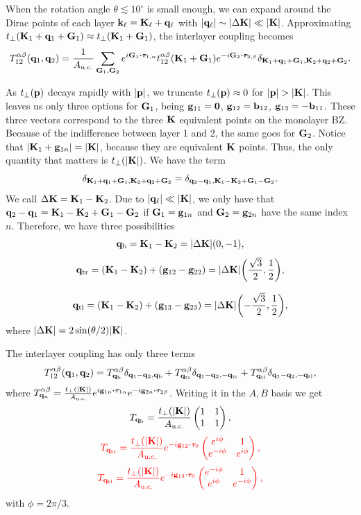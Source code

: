 When the rotation angle $\theta \lesssim 10^\circ$ is small enough, we can expand around the Dirac points of each layer ${\vb{k}}_\ell = {\vb{K}}_\ell + {\vb{q}}_\ell$ with $\abs{{\vb{q}}_\ell} \sim \abs{\Delta {\vb{K}}} \ll \abs{{\vb{K}}}$. Approximating $t_\perp({\vb{K}}_1+{\vb{q}}_1+{\vb{G}}_1) \approx t_\perp({\vb{K}}_1+{\vb{G}}_1)$, the interlayer coupling becomes
$$
T_{12}^{\alpha\beta}(\q_1,\q_2) = \frac{1}{A_{\text{u.c.}}} \sum_{\G_1,\G_2} e^{i\G_1\vdot\vtau_{1,\alpha}}
t_{12}^{\alpha\beta}(\K_1+\G_1) e^{-i\G_2\vdot\vtau_{2,\beta}}
\delta_{\K_1+\q_1+\G_1,\K_2+\q_2+\G_2}.
$$

As $t_\perp({\vb{p}})$ decays rapidly with $\abs{{\vb{p}}}$, we truncate $t_\perp({\vb{p}}) \approx 0$ for $\abs{{\vb{p}}} > \abs{{\vb{K}}}$. This leaves us only three options for ${\vb{G}}_1$, being ${\vb{g}}_{11} = {\vb{0}}$, ${\vb{g}}_{12} = {\vb{b}}_{12}$, ${\vb{g}}_{13} = -{\vb{b}}_{11}$. These three vectors correspond to the three ${\vb{K}}$ equivalent points on the monolayer BZ. Because of the indifference between layer 1 and 2, the same goes for ${\vb{G}}_2$. Notice that $\abs{{\vb{K}}_1+{\vb{g}}_{1n}} = \abs{{\vb{K}}}$, because they are equivalent ${\vb{K}}$ points. Thus, the only quantity that matters is $t_\perp(\abs{{\vb{K}}})$. We have the term
$$
\delta_{{\vb{K}}_1+{\vb{q}}_1+{\vb{G}}_1,{\vb{K}}_2+{\vb{q}}_2+{\vb{G}}_2} = \delta_{{\vb{q}}_2-{\vb{q}}_1,{\vb{K}}_1-{\vb{K}}_2+{\vb{G}}_1-{\vb{G}}_2}.
$$
We call $\Delta{\vb{K}} = {\vb{K}}_1-{\vb{K}}_2$. Due to $\abs{{\vb{q}}_\ell} \ll \abs{{\vb{K}}}$, we only have that ${\vb{q}}_2-{\vb{q}}_1 = {\vb{K}}_1-{\vb{K}}_2+{\vb{G}}_1-{\vb{G}}_2$ if ${\vb{G}}_1 = {\vb{g}}_{1n}$ and ${\vb{G}}_2 = {\vb{g}}_{2n}$ have the same index $n$. Therefore, we have three possibilities
$$
{\vb{q}}_\text{b} = {\vb{K}}_1 - {\vb{K}}_2 = \abs{\Delta {\vb{K}}} \qty(0, -1),
$$
$$
{\vb{q}}_\text{tr} = ({\vb{K}}_1 - {\vb{K}}_2) + ({\vb{g}}_{12} - {\vb{g}}_{22}) = \abs{\Delta {\vb{K}}} \qty(\frac{\sqrt{3}}{2}, \frac{1}{2}),
$$

$$
{\vb{q}}_\text{tl} = ({\vb{K}}_1 - {\vb{K}}_2) + ({\vb{g}}_{13} - {\vb{g}}_{23}) = \abs{\Delta {\vb{K}}} \qty(-\frac{\sqrt{3}}{2}, \frac{1}{2}),
$$
where $\abs{\Delta {\vb{K}}} = 2 \sin(\theta/2) \abs{{\vb{K}}}$.

The interlayer coupling has only three terms
$$
T_{12}^{\alpha\beta}({\vb{q}}_1,{\vb{q}}_2) =
T^{\alpha\beta}_{{\vb{q}}_\text{b}} \delta_{{\vb{q}}_1-{\vb{q}}_2, {\vb{q}}_\text{b}} +
T^{\alpha\beta}_{{\vb{q}}_\text{tr}} \delta_{{\vb{q}}_1-{\vb{q}}_2, -{\vb{q}}_\text{tr}} +
T^{\alpha\beta}_{{\vb{q}}_\text{tl}} \delta_{{\vb{q}}_1-{\vb{q}}_2, -{\vb{q}}_\text{tl}},
$$
where $T^{\alpha\beta}_{\q_n} = \frac{t_\perp(\abs{\K})}{A_{\text{u.c.}}} e^{i \g_{1n} \vdot \bm{\tau}_{1\alpha}}
e^{-i \g_{2n} \vdot \bm{\tau}_{2\beta}}$. Writing it in the $A, B$ basis we get
$$
T_{{\vb{q}}_\text{b}} = \frac{t_\perp(\abs{{\vb{K}}})}{A_{\text{u.c.}}}
\begin{pmatrix}
1 & 1 \\
1 & 1
\end{pmatrix},
$$
$$
\textcolor{red}{
T_{\q_\text{tr}} = \frac{t_\perp(\abs{\K})}{A_{\text{u.c.}}} e^{-i \g_{12} \vdot \vtau_0}
\begin{pmatrix}
e^{i\phi} & 1 \\
e^{-i\phi} & e^{i\phi}
\end{pmatrix},
}
$$
$$
\textcolor{red}{
T_{\q_\text{tl}} = \frac{t_\perp(\abs{\K})}{A_{\text{u.c.}}} e^{-i \g_{13} \vdot \vtau_0}
\begin{pmatrix}
e^{-i\phi} & 1 \\
e^{i\phi} & e^{-i\phi}
\end{pmatrix},
}
$$
with $\phi = 2\pi/3$.

